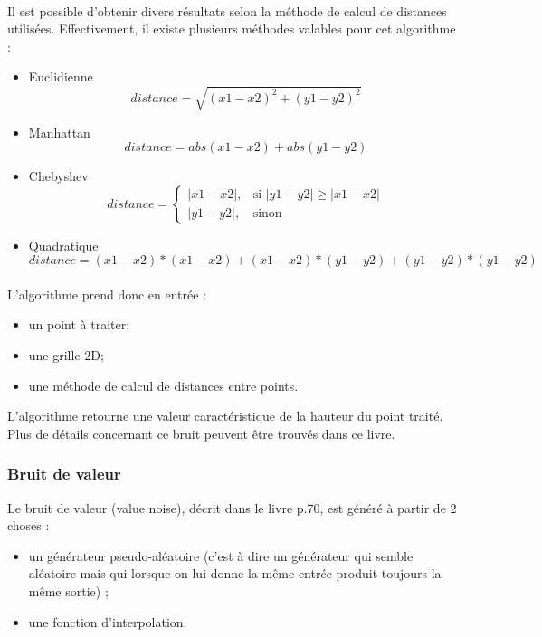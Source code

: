 \paragraph{}
Il est possible d'obtenir divers résultats selon la méthode de calcul de distances utilisées. Effectivement, il existe plusieurs méthodes valables pour cet algorithme :
\begin{itemize}
 \item Euclidienne
 \begin{equation}
  distance = \sqrt{(x1 - x2)^2 + (y1 - y2)^2}
 \end{equation}
 \item Manhattan
 \begin{equation}
  distance = abs(x1-x2) + abs(y1-y2) 
 \end{equation}
 \item Chebyshev
 \[
    distance= 
\begin{cases}
    |x1-x2|,& \text{si } |y1-y2|\geq|x1-x2|\\
    |y1-y2|,& \text{sinon}
\end{cases}
\]
 \item Quadratique
  \begin{equation}
  distance = (x1-x2)*(x1-x2) + (x1-x2)*(y1-y2) + (y1-y2)*(y1-y2)
  \end{equation}
\end{itemize}

\paragraph{}
L'algorithme prend donc en entrée :
\begin{itemize}
 \item un point à traiter;
 \item une grille 2D;
 \item une méthode de calcul de distances entre points.
\end{itemize}
L'algorithme retourne une valeur caractéristique de la hauteur du point traité.\newline
Plus de détails concernant ce bruit peuvent être trouvés dans ce livre\cite{Eber02}.


\subsubsection{Bruit de valeur}
Le bruit de valeur (value noise), décrit dans le livre
\cite{Eber02} p.70, est généré à partir de 2 choses :\\
\begin{itemize}
\item un générateur pseudo-aléatoire (c'est à dire un générateur qui semble
aléatoire mais qui lorsque on lui donne la même entrée produit toujours la même
sortie) ;
\item une fonction d'interpolation.\\
\end{itemize}


